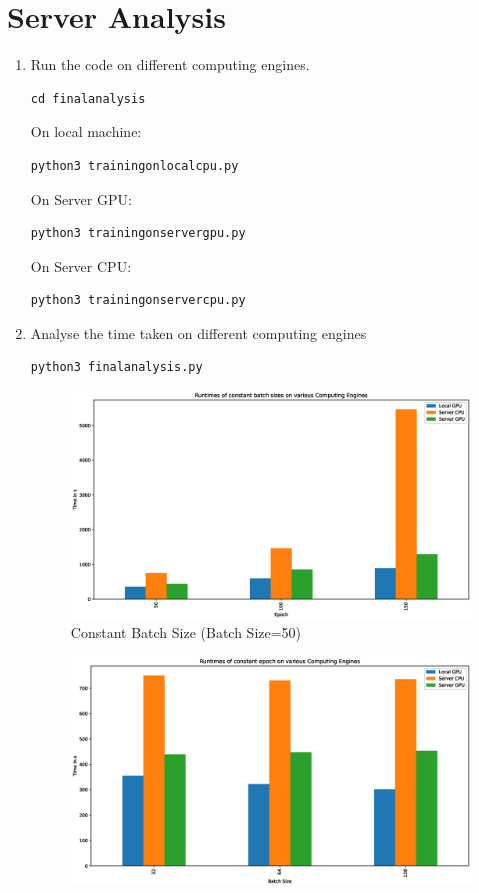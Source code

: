 \documentclass[journal,12pt,twocolumn]{IEEEtran}
\numberwithin{equation}{section}
\renewcommand\thesection{\arabic{section}}
\begin{document}
\section{Server Analysis}
\begin{enumerate}[label=\thesection.\arabic*.,ref=\thesection.\theenumi]
\item Run the code on different computing engines.\\
\begin{lstlisting}
cd finalanalysis
\end{lstlisting}
On local machine:
\begin{lstlisting}
python3 trainingonlocalcpu.py
\end{lstlisting}
On Server GPU:
\begin{lstlisting}
python3 trainingonservergpu.py
\end{lstlisting}
On Server CPU:
\begin{lstlisting}
python3 trainingonservercpu.py
\end{lstlisting}
\item Analyse the time taken on different computing engines
\begin{lstlisting}
python3 finalanalysis.py
\end{lstlisting}
\begin{figure}[!ht]
\begin{centering}
\includegraphics[width=\columnwidth]{constantbatch}
\end{centering}
\caption{Constant Batch Size (Batch Size=50)}
\end{figure}
\begin{figure}[!ht]
\begin{centering}
\includegraphics[width=\columnwidth]{constantepoch}

\end{centering}
\end{figure}
\end{enumerate}
\end{document}
